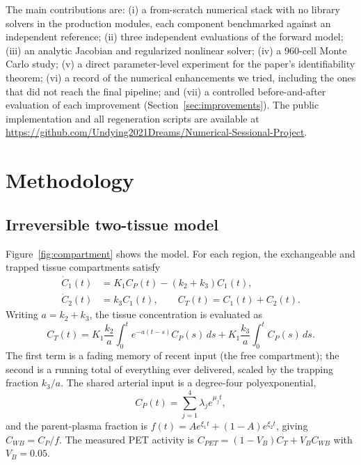 \documentclass[sigconf,nonacm]{acmart}
\begin{document}
The main contributions are: (i) a from-scratch numerical stack with no library solvers in the production modules, each component benchmarked against an independent reference; (ii) three independent evaluations of the forward model; (iii) an analytic Jacobian and regularized nonlinear solver; (iv) a 960-cell Monte Carlo study; (v) a direct parameter-level experiment for the paper's identifiability theorem; (vi) a record of the numerical enhancements we tried, including the ones that did not reach the final pipeline; and (vii) a controlled before-and-after evaluation of each improvement (Section~\ref{sec:improvements}). The public implementation and all regeneration scripts are available at \url{https://github.com/Undying2021Dreams/Numerical-Sessional-Project}.

\section{Methodology}

\subsection{Irreversible two-tissue model}

Figure~\ref{fig:compartment} shows the model. For each region, the exchangeable and trapped tissue compartments satisfy
\begin{align}
  \dot C_1(t) &= K_1 C_P(t)-(k_2+k_3)C_1(t), \\
  \dot C_2(t) &= k_3 C_1(t), \qquad C_T(t)=C_1(t)+C_2(t).
\end{align}
Writing $a=k_2+k_3$, the tissue concentration is evaluated as
\begin{equation}
C_T(t)=K_1\frac{k_2}{a}\int_0^t e^{-a(t-s)}C_P(s)\,ds
       +K_1\frac{k_3}{a}\int_0^t C_P(s)\,ds .
\label{eq:ct}
\end{equation}
The first term is a fading memory of recent input (the free compartment); the second is a running total of everything ever delivered, scaled by the trapping fraction $k_3/a$. The shared arterial input is a degree-four polyexponential,
\begin{equation}
C_P(t)=\sum_{j=1}^{4}\lambda_j e^{\mu_jt},
\label{eq:cp}
\end{equation}
and the parent-plasma fraction is
$f(t)=A e^{\xi_1t}+(1-A)e^{\xi_2t}$, giving
$C_{WB}=C_P/f$. The measured PET activity is
$C_{PET}=(1-V_B)C_T+V_BC_{WB}$ with $V_B=0.05$.
\end{document}

